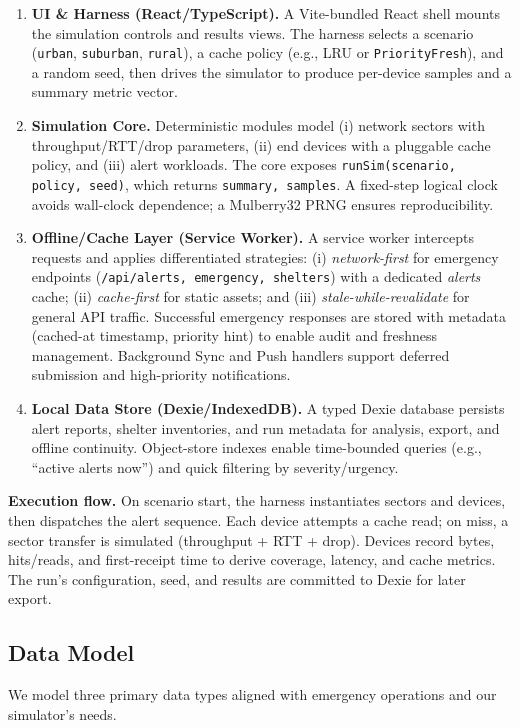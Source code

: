 \documentclass[11pt,twocolumn]{article}
\begin{document}
\begin{enumerate}
\item \textbf{UI \& Harness (React/TypeScript).} A Vite-bundled React shell mounts the simulation controls and results views. The harness selects a scenario (\texttt{urban}, \texttt{suburban}, \texttt{rural}), a cache policy (e.g., LRU or \texttt{PriorityFresh}), and a random seed, then drives the simulator to produce per-device samples and a summary metric vector.

\item \textbf{Simulation Core.} Deterministic modules model (i) network sectors with throughput/RTT/drop parameters, (ii) end devices with a pluggable cache policy, and (iii) alert workloads. The core exposes \texttt{runSim({scenario, policy, seed})}, which returns \texttt{{summary, samples}}. A fixed-step logical clock avoids wall-clock dependence; a Mulberry32 PRNG ensures reproducibility.

\item \textbf{Offline/Cache Layer (Service Worker).} A service worker intercepts requests and applies differentiated strategies: (i) \emph{network-first} for emergency endpoints (\texttt{/api/{alerts, emergency, shelters}}) with a dedicated \textit{alerts} cache; (ii) \emph{cache-first} for static assets; and (iii) \emph{stale-while-revalidate} for general API traffic. Successful emergency responses are stored with metadata (cached-at timestamp, priority hint) to enable audit and freshness management. Background Sync and Push handlers support deferred submission and high-priority notifications.

\item \textbf{Local Data Store (Dexie/IndexedDB).} A typed Dexie database persists alert reports, shelter inventories, and run metadata for analysis, export, and offline continuity. Object-store indexes enable time-bounded queries (e.g., “active alerts now”) and quick filtering by severity/urgency.
\end{enumerate}

\noindent\textbf{Execution flow.} On scenario start, the harness instantiates sectors and devices, then dispatches the alert sequence. Each device attempts a cache read; on miss, a sector transfer is simulated (throughput + RTT + drop). Devices record bytes, hits/reads, and first-receipt time to derive coverage, latency, and cache metrics. The run’s configuration, seed, and results are committed to Dexie for later export.

\subsection{Data Model}
We model three primary data types aligned with emergency operations and our simulator’s needs.
\end{document}
